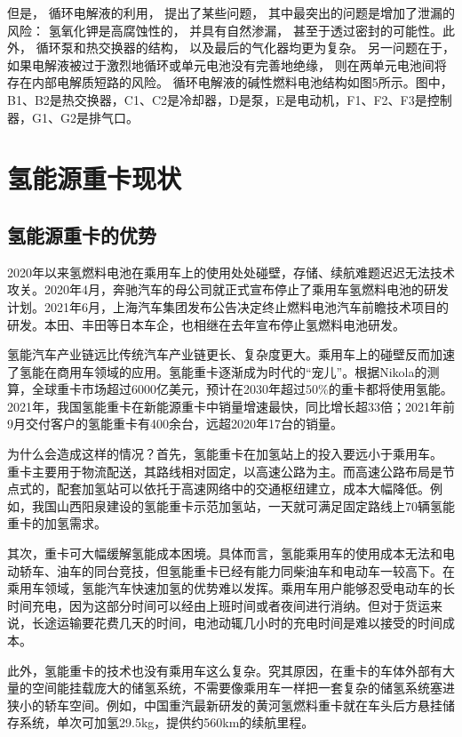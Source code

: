 \documentclass[UTF8,a4paper,11pt]{article}
\begin{document}
但是， 循环电解液的利用， 提出了某些问题， 其中最突出的问题是增加了泄漏的风险： 氢氧化钾是高腐蚀性的， 并具有自然渗漏， 甚至于透过密封的可能性。此外， 循环泵和热交换器的结构， 以及最后的气化器均更为复杂。 另一问题在于，如果电解液被过于激烈地循环或单元电池没有完善地绝缘， 则在两单元电池间将存在内部电解质短路的风险。 循环电解液的碱性燃料电池结构如图5所示。图中，B1、B2是热交换器，C1、C2是冷却器，D是泵，E是电动机，F1、F2、F3是控制器，G1、G2是排气口。

\section{氢能源重卡现状}
\subsection{氢能源重卡的优势}
2020年以来氢燃料电池在乘用车上的使用处处碰壁，存储、续航难题迟迟无法技术攻关。2020年4月，奔驰汽车的母公司就正式宣布停止了乘用车氢燃料电池的研发计划。2021年6月，上海汽车集团发布公告决定终止燃料电池汽车前瞻技术项目的研发。本田、丰田等日本车企，也相继在去年宣布停止氢燃料电池研发。

氢能汽车产业链远比传统汽车产业链更长、复杂度更大。乘用车上的碰壁反而加速了氢能在商用车领域的应用。氢能重卡逐渐成为时代的“宠儿”。根据Nikola的测算，全球重卡市场超过6000亿美元，预计在2030年超过50\%的重卡都将使用氢能。2021年，我国氢能重卡在新能源重卡中销量增速最快，同比增长超33倍；2021年前9月交付客户的氢能重卡有400余台，远超2020年17台的销量。

为什么会造成这样的情况？首先，氢能重卡在加氢站上的投入要远小于乘用车。 重卡主要用于物流配送，其路线相对固定，以高速公路为主。而高速公路布局是节点式的，配套加氢站可以依托于高速网络中的交通枢纽建立，成本大幅降低。例如，我国山西阳泉建设的氢能重卡示范加氢站，一天就可满足固定路线上70辆氢能重卡的加氢需求。 

其次，重卡可大幅缓解氢能成本困境。具体而言，氢能乘用车的使用成本无法和电动轿车、油车的同台竞技，但氢能重卡已经有能力同柴油车和电动车一较高下。在乘用车领域，氢能汽车快速加氢的优势难以发挥。乘用车用户能够忍受电动车的长时间充电，因为这部分时间可以经由上班时间或者夜间进行消纳。但对于货运来说，长途运输要花费几天的时间，电池动辄几小时的充电时间是难以接受的时间成本。

此外，氢能重卡的技术也没有乘用车这么复杂。究其原因，在重卡的车体外部有大量的空间能挂载庞大的储氢系统，不需要像乘用车一样把一套复杂的储氢系统塞进狭小的轿车空间。例如，中国重汽最新研发的黄河氢燃料重卡就在车头后方悬挂储存系统，单次可加氢29.5kg，提供约560km的续航里程。 
\end{document}
